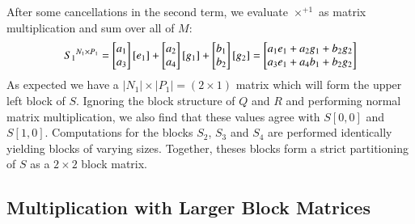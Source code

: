 After some cancellations in the second term, we evaluate $\times^{+1}$ as matrix multiplication and sum over all of $M$:
\begin{equation*}
	{S_1}^{N_1 \times P_1} =
			\begin{bmatrix}\vphantom{b}a_1 \\ \vphantom{b}a_3 \end{bmatrix}
			[e_1]
		+ 	\begin{bmatrix}\vphantom{b}a_2 \\ \vphantom{b}a_4 \end{bmatrix}
			[g_1]
		+	\begin{bmatrix} b_1 \\ b_2 \end{bmatrix}
			[ g_2 ]
		=  \begin{bmatrix}a_1e_1+a_2g_1+b_2g_2\\ a_3e_1+a_4b_1+b_2g_2\end{bmatrix}
\end{equation*}
As expected we have a $|N_1| \times |P_1| = (2 \times 1)$ matrix which will form the upper left block of $S$.
Ignoring the block structure of $Q$ and $R$ and performing normal matrix multiplication, we also find that these values 
agree with $S[0,0]$ and $S[1,0]$.
Computations for the blocks $S_2$, $S_3$ and $S_4$ are performed identically yielding blocks of varying sizes.
Together, theses blocks form a strict partitioning of $S$ as a $2\times 2$ block matrix.







\subsection{Multiplication with Larger Block Matrices}

